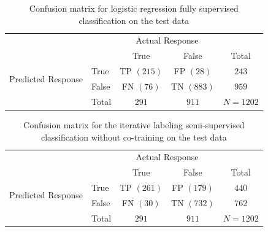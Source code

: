 \documentclass[10pt,letterpaper]{article}
\begin{document}
%
\begin{table}[ht!]
\begin{center}
    \begin{tabular}{l|l|c|c|c}
    \multicolumn{2}{c}{}&\multicolumn{2}{c}{Actual Response}&\\
    \cline{3-4}
    \multicolumn{2}{c|}{}&True&False&\multicolumn{1}{c}{Total}\\
    \cline{2-4}
    \multirow{2}{*}{Predicted Response}& True & TP $(215)$ & FP $(28)$ & $243$\\
    \cline{2-4}
    & False & FN $(76)$ & TN $(883)$ & $959$\\
    \cline{2-4}
    \multicolumn{1}{c}{} & \multicolumn{1}{c}{Total} & \multicolumn{1}{c}{$291$} & \multicolumn{1}{c}{$911$} & \multicolumn{1}{c}{$N = 1202$}\\
    \end{tabular}
\end{center}
\caption{Confusion matrix for logistic regression fully supervised classification on the test data}
\label{table:12}
\end{table}
\begin{table}[ht!]
\begin{center}
    \begin{tabular}{l|l|c|c|c}
    \multicolumn{2}{c}{}&\multicolumn{2}{c}{Actual Response}&\\
    \cline{3-4}
    \multicolumn{2}{c|}{}&True&False&\multicolumn{1}{c}{Total}\\
    \cline{2-4}
    \multirow{2}{*}{Predicted Response}& True & TP $(261)$ & FP $(179)$ & $440$\\
    \cline{2-4}
    & False & FN $(30)$ & TN $(732)$ & $762$\\
    \cline{2-4}
    \multicolumn{1}{c}{} & \multicolumn{1}{c}{Total} & \multicolumn{1}{c}{$291$} & \multicolumn{1}{c}{$911$} & \multicolumn{1}{c}{$N = 1202$}\\
    \end{tabular}
\end{center}
\caption{Confusion matrix for the iterative labeling semi-supervised classification without co-training on the test data}
\label{table:11}
\end{table}
%
\end{document}
